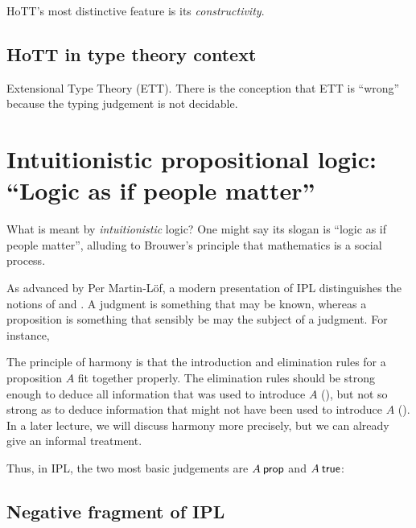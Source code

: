 \documentclass[12pt]{article}
\begin{document}
HoTT's most distinctive feature is its \emph{constructivity}.

\subsection{HoTT in type theory context}\label{subsec:type_theory_context}

Extensional Type Theory (ETT).  There is the conception that ETT is ``wrong''~\cite{Harper2012}
because the typing judgement is not decidable.

\section{Intuitionistic propositional logic: ``Logic as if people matter''}\label{sec:ipl}


What is meant by \emph{intuitionistic} logic?  One might say its slogan is ``logic as if people matter'', alluding to Brouwer's principle that mathematics is a social process.

%
%
As advanced by Per Martin-L\"{o}f, a modern presentation of \gls{IPL} distinguishes the notions of  and .
A judgment is something that may be known, whereas a proposition is something that sensibly be may the subject of a judgment.
For instance, 


The principle of harmony is that the introduction and elimination rules for a proposition $A$ fit together properly.  The elimination rules should be strong enough to deduce all information that was used to introduce $A$ (), but not so strong as to deduce information that might not have been used to introduce $A$ ().  In a later lecture, we will discuss harmony more precisely, but we can already give an informal treatment.


Thus, in \gls{IPL}, the two most basic judgements are $A \prop$ and $A \true$:


\subsection{Negative fragment of \gls{IPL}}\label{sec:ipl-negative}
\end{document}
